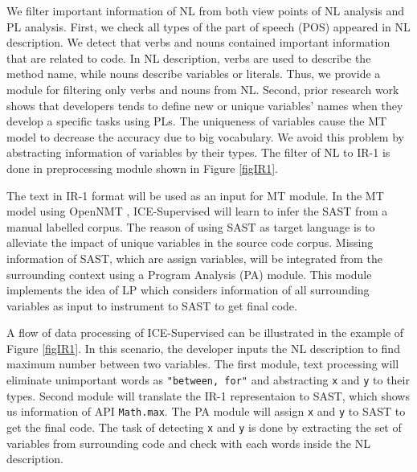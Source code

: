 \documentclass[sigconf,review]{acmart}
\begin{document}
We filter important information of NL from both view points of NL analysis and PL analysis. First, we check all types of the part of speech (POS) appeared in NL description. We detect that verbs and nouns contained important information that are related to code. In NL description, verbs are used to describe the method name, while nouns describe variables or literals. Thus, we provide a module for filtering only verbs and nouns from NL. Second, prior research work \cite{013} shows that developers tends to define new or unique variables' names when they develop a specific tasks using PLs. The uniqueness of variables cause the MT model to decrease the accuracy due to big vocabulary. We avoid this problem by abstracting information of variables by their types. The filter of NL to IR-1 is done in preprocessing module shown in Figure \ref{figIR1}.

The text in IR-1 format will be used as an input for MT module. In the MT model using OpenNMT \cite{038}, ICE-Supervised will learn to infer the SAST from a manual labelled corpus. The reason of using SAST as target language is to alleviate the impact of unique variables in the source code corpus. Missing information of SAST, which are assign variables, will be integrated from the surrounding context using a Program Analysis (PA) module. This module implements the idea of LP which considers information of all surrounding variables as input to instrument to SAST to get final code.

A flow of data processing of ICE-Supervised can be illustrated in the example of Figure \ref{figIR1}. In this scenario, the developer inputs the NL description to find maximum number between two variables. The first module, text processing will eliminate unimportant words as \texttt{"between, for"} and abstracting \texttt{x} and \texttt{y} to their types. Second module will translate the IR-1 representaion to SAST, which shows us information of API \texttt{Math.max}. The PA module will assign \texttt{x} and \texttt{y} to SAST to get the final code. The task of detecting \texttt{x} and \texttt{y} is done by extracting the set of variables from surrounding code and check with each words inside the NL description.
\end{document}
